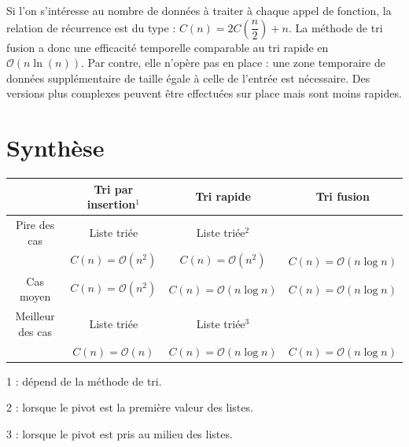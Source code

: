 \documentclass[10pt,fleqn]{article} %
\begin{document}
Si l'on s'intéresse au nombre de données à traiter à chaque appel de fonction, la relation de récurrence est du type :
$C(n) = 2 C\left(\dfrac{n}{2}\right)  +  n$.
La méthode de tri fusion a donc une efficacité temporelle comparable au tri rapide en $\mathcal{O}\left(n \ln(n)\right)$. Par contre, elle n'opère pas en place : une zone temporaire de données supplémentaire de taille égale à celle de l'entrée est nécessaire. Des versions plus complexes peuvent être effectuées sur place mais sont moins rapides.










\section{Synthèse}

\begin{center}
\begin{tabular}{|c|c|c|c|}
\hline
& Tri par insertion$^1$ & Tri rapide & Tri fusion \\
\hline 
{Pire des cas} &  Liste triée& Liste triée$^2$ & \\ 
&  $ C(n)=\mathcal{O}\left(n^2 \right)$ & $ C(n)=\mathcal{O}\left(n^2 \right)$ & $ C(n)=\mathcal{O}\left(n \log  n \right)$ \\ \hline
Cas moyen & $ C(n)=\mathcal{O}\left(n^2 \right)$ &$ C(n)=\mathcal{O}\left(n \log n\right)$  & $ C(n)=\mathcal{O}\left(n \log n\right)$ \\ \hline
Meilleur des cas  & Liste triée & Liste triée$^3$ & \\ 
  & $ C(n)=\mathcal{O}\left(n \right)$ & $ C(n)=\mathcal{O}\left(n \log n \right)$ & $ C(n)=\mathcal{O}\left(n \log n\right)$ \\ \hline
\end{tabular}
\end{center}

\footnotesize{1 : dépend de la méthode de tri.}

\footnotesize{2 : lorsque le pivot est la première valeur des listes.}

\footnotesize{3 : lorsque le pivot est pris au milieu des listes.}
\begin{thebibliography}{2}

\end{thebibliography}
\end{document}
